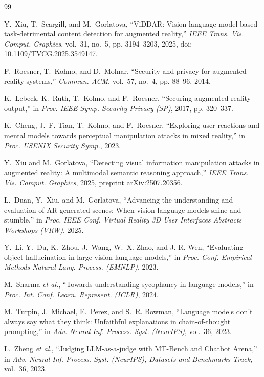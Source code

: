 \documentclass[conference]{IEEEtran}
\begin{document}
\begin{thebibliography}{99}

Y.~Xiu, T.~Scargill, and M.~Gorlatova, ``{ViDDAR}: Vision language model-based task-detrimental
content detection for augmented reality,'' \emph{IEEE Trans. Vis. Comput. Graphics}, vol.~31, no.~5,
pp. 3194--3203, 2025, doi: 10.1109/TVCG.2025.3549147.

F.~Roesner, T.~Kohno, and D.~Molnar, ``Security and privacy for augmented reality systems,''
\emph{Commun. ACM}, vol.~57, no.~4, pp. 88--96, 2014.

K.~Lebeck, K.~Ruth, T.~Kohno, and F.~Roesner, ``Securing augmented reality output,'' in \emph{Proc.
IEEE Symp. Security Privacy (SP)}, 2017, pp. 320--337.

K.~Cheng, J.~F. Tian, T.~Kohno, and F.~Roesner, ``Exploring user reactions and mental models towards
perceptual manipulation attacks in mixed reality,'' in \emph{Proc. USENIX Security Symp.}, 2023.

Y.~Xiu and M.~Gorlatova, ``Detecting visual information manipulation attacks in augmented reality: A
multimodal semantic reasoning approach,'' \emph{IEEE Trans. Vis. Comput. Graphics}, 2025, preprint
arXiv:2507.20356.

L.~Duan, Y.~Xiu, and M.~Gorlatova, ``Advancing the understanding and evaluation of {AR}-generated
scenes: When vision-language models shine and stumble,'' in \emph{Proc. IEEE Conf. Virtual Reality 3D
User Interfaces Abstracts Workshops (VRW)}, 2025.

Y.~Li, Y.~Du, K.~Zhou, J.~Wang, W.~X. Zhao, and J.-R. Wen, ``Evaluating object hallucination in large
vision-language models,'' in \emph{Proc. Conf. Empirical Methods Natural Lang. Process. (EMNLP)},
2023.

M.~Sharma \emph{et al.}, ``Towards understanding sycophancy in language models,'' in \emph{Proc. Int.
Conf. Learn. Represent. (ICLR)}, 2024.

M.~Turpin, J.~Michael, E.~Perez, and S.~R. Bowman, ``Language models don't always say what they think:
Unfaithful explanations in chain-of-thought prompting,'' in \emph{Adv. Neural Inf. Process. Syst.
(NeurIPS)}, vol.~36, 2023.

L.~Zheng \emph{et al.}, ``Judging {LLM}-as-a-judge with {MT-Bench} and {Chatbot Arena},'' in \emph{Adv.
Neural Inf. Process. Syst. (NeurIPS), Datasets and Benchmarks Track}, vol.~36, 2023.


\end{thebibliography}
\end{document}

